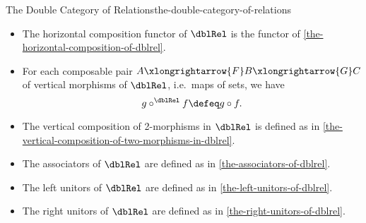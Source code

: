 \begin{definition}{The Double Category of Relations}{the-double-category-of-relations}
\begin{itemize}
\begin{webcompile}
            \end{webcompile}%
        \item{}The horizontal composition functor of $\dblRel$ is the functor of \cref{the-horizontal-composition-of-dblrel}.
        \item{}For each composable pair $A\smash{\xlongrightarrow{F}}B\smash{\xlongrightarrow{G}}C$ of vertical morphisms of $\dblRel$, i.e.\ maps of sets, we have
            \[
                g\mathbin{{\circ}^{\dblRel}}f
                \defeq
                g\circ f.
            \]%
        \item{}The vertical composition of 2-morphisms in $\dblRel$ is defined as in \cref{the-vertical-composition-of-two-morphisms-in-dblrel}.
        \item{}The associators of $\dblRel$ are defined as in \cref{the-associators-of-dblrel}.
        \item{}The left unitors of $\dblRel$ are defined as in \cref{the-left-unitors-of-dblrel}.
        \item{}The right unitors of $\dblRel$ are defined as in \cref{the-right-unitors-of-dblrel}.
    \end{itemize}
\end{definition}
